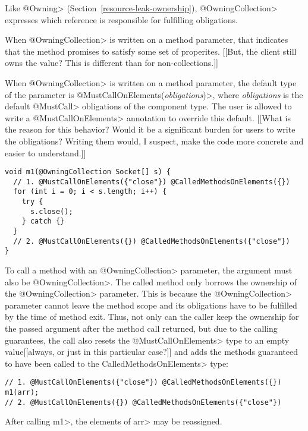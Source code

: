 
Like \<@Owning> (Section~\ref{resource-leak-ownership}),
\<@OwningCollection> expresses which reference is responsible for
fulfilling obligations.

When \<@OwningCollection> is written on a method parameter,
that indicates that the method promises to satisfy some set of properites.
[[But, the client still owns the value?  This is different than for non-collections.]]

When \<@OwningCollection> is written on a method parameter, the default
type of the parameter is \<@MustCallOnElements(\textit{obligations})>,
where \textit{obligations} is the default \<@MustCall> obligations of the
component type. The user is allowed to write a
\<@MustCallOnElements> annotation to override this default.
[[What is the reason for this behavior?  Would it be a significant burden
for users to write the obligations?  Writing them would, I suspect, make
the code more concrete and easier to understand.]]


\begin{verbatim}
void m1(@OwningCollection Socket[] s) {
  // 1. @MustCallOnElements({"close"}) @CalledMethodsOnElements({})
  for (int i = 0; i < s.length; i++) {
    try {
      s.close();
    } catch {}
  }
  // 2. @MustCallOnElements({}) @CalledMethodsOnElements({"close"})
}
\end{verbatim}

To call a method with an \<@OwningCollection> parameter, the argument must
also be \<@OwningCollection>. The called method only borrows the ownership
of the \<@OwningCollection> parameter. This is because the
\<@OwningCollection> parameter cannot leave the method scope and its
obligations have to be fulfilled by the time of method exit. Thus, not only
can the caller keep the ownership for the passed argument after the method
call returned, but due to the calling guarantees, the call also resets the
\<@MustCallOnElements> type to an empty value[[always, or just in this
particular case?]] and adds the methods guaranteed to have been called to
the \<CalledMethodsOnElements> type:

\begin{verbatim}
// 1. @MustCallOnElements({"close"}) @CalledMethodsOnElements({})
m1(arr);
// 2. @MustCallOnElements({}) @CalledMethodsOnElements({"close"})
\end{verbatim}

After calling \<m1>, the elements of \<arr> may be reassigned.

